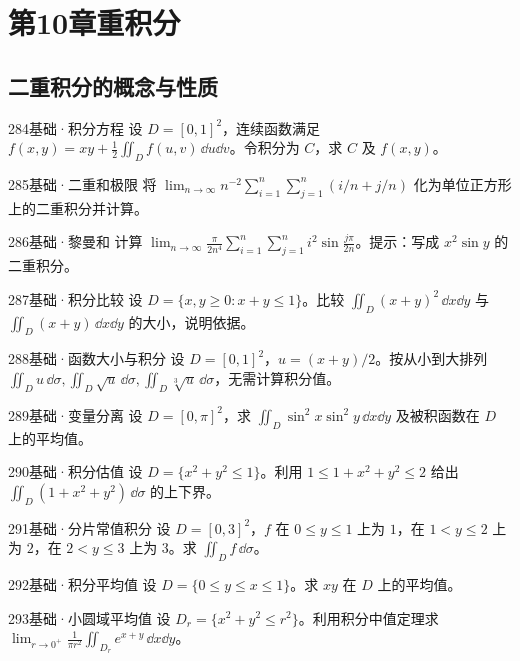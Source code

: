 \section{第10章\quad 重积分}
\subsection{二重积分的概念与性质}

\begin{exercise}{284}{基础·积分方程}
设 $D=[0,1]^2$，连续函数满足 $f(x,y)=xy+\frac12\iint_D f(u,v)\,\dd u\dd v$。令积分为 $C$，求 $C$ 及 $f(x,y)$。
\end{exercise}
\begin{exercise}{285}{基础·二重和极限}
将 $\lim_{n\to\infty}n^{-2}\sum_{i=1}^n\sum_{j=1}^n(i/n+j/n)$ 化为单位正方形上的二重积分并计算。
\end{exercise}
\begin{exercise}{286}{基础·黎曼和}
计算 $\lim_{n\to\infty}\frac{\pi}{2n^4}\sum_{i=1}^n\sum_{j=1}^n i^2\sin\frac{j\pi}{2n}$。提示：写成 $x^2\sin y$ 的二重积分。
\end{exercise}
\begin{exercise}{287}{基础·积分比较}
设 $D=\{x,y\geq0:x+y\leq1\}$。比较 $\iint_D(x+y)^2\,\dd x\dd y$ 与 $\iint_D(x+y)\,\dd x\dd y$ 的大小，说明依据。
\end{exercise}
\begin{exercise}{288}{基础·函数大小与积分}
设 $D=[0,1]^2$，$u=(x+y)/2$。按从小到大排列 $\iint_Du\,\dd\sigma,\iint_D\sqrt u\,\dd\sigma,\iint_D\sqrt[3]u\,\dd\sigma$，无需计算积分值。
\end{exercise}
\begin{exercise}{289}{基础·变量分离}
设 $D=[0,\pi]^2$，求 $\iint_D\sin^2x\sin^2y\,\dd x\dd y$ 及被积函数在 $D$ 上的平均值。
\end{exercise}
\begin{exercise}{290}{基础·积分估值}
设 $D=\{x^2+y^2\leq1\}$。利用 $1\leq1+x^2+y^2\leq2$ 给出 $\iint_D(1+x^2+y^2)\,\dd\sigma$ 的上下界。
\end{exercise}
\begin{exercise}{291}{基础·分片常值积分}
设 $D=[0,3]^2$，$f$ 在 $0\leq y\leq1$ 上为 $1$，在 $1<y\leq2$ 上为 $2$，在 $2<y\leq3$ 上为 $3$。求 $\iint_D f\,\dd\sigma$。
\end{exercise}
\begin{exercise}{292}{基础·积分平均值}
设 $D=\{0\leq y\leq x\leq1\}$。求 $xy$ 在 $D$ 上的平均值。
\end{exercise}
\begin{exercise}{293}{基础·小圆域平均值}
设 $D_r=\{x^2+y^2\leq r^2\}$。利用积分中值定理求 $\lim_{r\to0^+}\frac1{\pi r^2}\iint_{D_r}e^{x+y}\,\dd x\dd y$。
\end{exercise}
